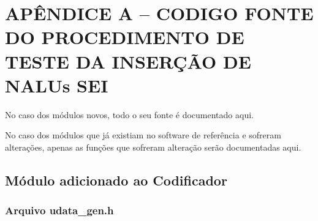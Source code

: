 \chapter{APÊNDICE A -- CODIGO FONTE DO PROCEDIMENTO DE TESTE DA INSERÇÃO DE NALUs SEI}

No caso dos módulos novos, todo o seu fonte é documentado aqui.

No caso dos módulos que já existiam no software de referência e sofreram alterações, apenas as funções que sofreram alteração serão documentadas aqui.


\section{Módulo adicionado ao Codificador}

\subsection{Arquivo udata\_gen.h}

